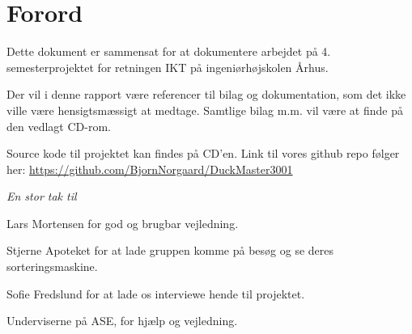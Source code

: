 \chapter{Forord}


Dette dokument er sammensat for at dokumentere arbejdet på 4. semesterprojektet for retningen IKT på ingeniørhøjskolen Århus.

Der vil i denne rapport være referencer til bilag og dokumentation, som det ikke ville være hensigtsmæssigt at medtage. Samtlige bilag m.m. vil være at finde på den vedlagt CD-rom. 

Source kode til projektet kan findes på CD'en. Link til vores github repo følger her: \newline \url{https://github.com/BjornNorgaard/DuckMaster3001}

\vspace{5mm}

\large{\textit{En stor tak til}}

\begin{displayquote}
    Lars Mortensen for god og brugbar vejledning.
\end{displayquote}

\begin{displayquote}
    Stjerne Apoteket for at lade gruppen komme på besøg og se deres sorteringsmaskine.
\end{displayquote}

\begin{displayquote}
    Sofie Fredslund for at lade os interviewe hende til projektet.
\end{displayquote}

\begin{displayquote}
   Underviserne på ASE, for hjælp og vejledning.
\end{displayquote}

